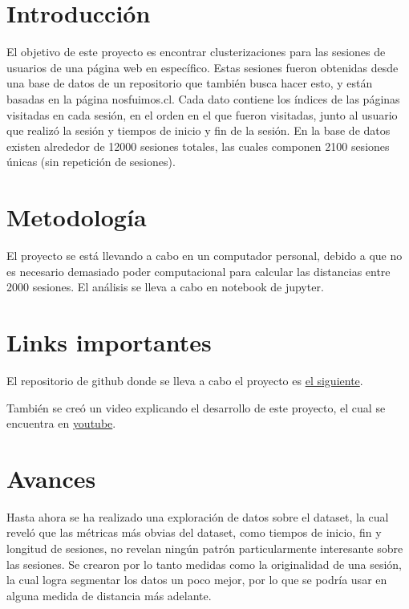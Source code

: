 \documentclass[letterpaper,11pt]{article} %
\begin{document}







\section{Introducción}
	El objetivo de este proyecto es encontrar clusterizaciones para las sesiones de usuarios de una página web en específico. Estas sesiones fueron obtenidas desde una base de datos de un repositorio que también busca hacer esto, y están basadas en la página nosfuimos.cl. Cada dato contiene los índices de las páginas visitadas en cada sesión, en el orden en el que fueron visitadas, junto al usuario que realizó la sesión y tiempos de inicio y fin de la sesión. En la base de datos existen alrededor de 12000 sesiones totales, las cuales componen 2100 sesiones únicas (sin repetición de sesiones).

\section{Metodología}
	El proyecto se está llevando a cabo en un computador personal, debido a que no es necesario demasiado poder computacional para calcular las distancias entre 2000 sesiones. El análisis se lleva a cabo en notebook de jupyter.

\section{Links importantes}
	El repositorio de github donde se lleva a cabo el proyecto es \href{https://github.com/danno-s/proyecto-bayes}{el siguiente}.

	También se creó un video explicando el desarrollo de este proyecto, el cual se encuentra en \href{https://youtu.be/s_9H0qUqTQ8}{youtube}.

\section{Avances}
	Hasta ahora se ha realizado una exploración de datos sobre el dataset, la cual reveló que las métricas más obvias del dataset, como tiempos de inicio, fin y longitud de sesiones, no revelan ningún patrón particularmente interesante sobre las sesiones. Se crearon por lo tanto medidas como la originalidad de una sesión, la cual logra segmentar los datos un poco mejor, por lo que se podría usar en alguna medida de distancia más adelante.
\end{document}
